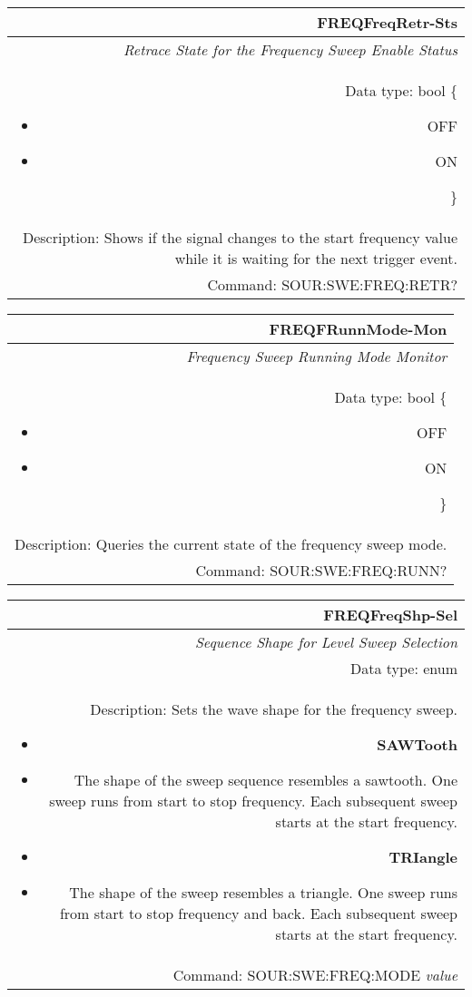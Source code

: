\documentclass[openany]{article}
\begin{document}
		\begin{tabular}{N}
			\hline
			\bfseries FREQFreqRetr-Sts \\ \hline
			\emph{Retrace State for the Frequency Sweep Enable Status} \\
			Data type: bool \{\begin{itemize}[noitemsep]
				\small
				\item[] OFF
				\item[] ON
			\end{itemize}\} \\
			Description: Shows if the signal changes to the start frequency value while it is waiting for the next trigger event. \\
			Command: SOUR:SWE:FREQ:RETR? \\

		\end{tabular}
%
		\begin{tabular}{N}
			\hline
			\bfseries FREQFRunnMode-Mon \\ \hline
			\emph{Frequency Sweep Running Mode Monitor} \\
			Data type: bool \{\begin{itemize}[noitemsep]
				\small
				\item[] OFF
				\item[] ON
			\end{itemize}\} \\
			Description: Queries the current state of the frequency sweep mode. \\
			Command: SOUR:SWE:FREQ:RUNN? \\

		\end{tabular}
%
		\begin{tabular}{N}
			\hline
			\bfseries FREQFreqShp-Sel \\ \hline
			\emph{Sequence Shape for Level Sweep Selection} \\
			Data type: enum \\
			Description: Sets the wave shape for the frequency sweep.\begin{itemize}[noitemsep]
				\small
				\item[] \textbf{SAWTooth}
				\item[] The shape of the sweep sequence resembles a sawtooth. One sweep runs from start to stop frequency. Each subsequent sweep starts at the start frequency.
				\item[] \textbf{TRIangle}
				\item[] The shape of the sweep resembles a triangle. One sweep runs from start to stop frequency and back. Each subsequent sweep starts at the start frequency.
			\end{itemize} \\
			Command: SOUR:SWE:FREQ:MODE \emph{value} \\

		\end{tabular}
\end{document}
